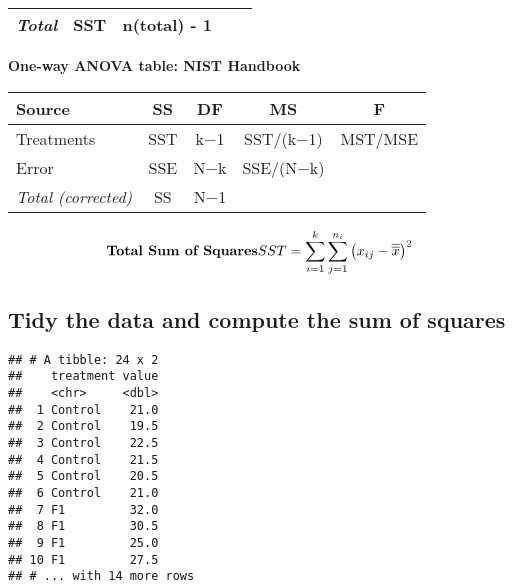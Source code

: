 \documentclass[]{book}
\newenvironment{Shaded}{\begin{snugshade}}{\end{snugshade}}
\newcommand{\DataTypeTok}[1]{\textcolor[rgb]{0.13,0.29,0.53}{#1}}
\newcommand{\KeywordTok}[1]{\textcolor[rgb]{0.13,0.29,0.53}{\textbf{#1}}}
\newcommand{\NormalTok}[1]{#1}
\newcommand{\OperatorTok}[1]{\textcolor[rgb]{0.81,0.36,0.00}{\textbf{#1}}}
\newcommand{\StringTok}[1]{\textcolor[rgb]{0.31,0.60,0.02}{#1}}
\theoremstyle{definition}
\theoremstyle{definition}
\theoremstyle{definition}
\theoremstyle{remark}
\begin{document}
\begin{longtable}[]{@{}lcccc@{}}
\begin{minipage}[t]{0.19\columnwidth}\raggedright
\emph{Total}\strut
\end{minipage} & \begin{minipage}[t]{0.19\columnwidth}\centering
SST\strut
\end{minipage} & \begin{minipage}[t]{0.22\columnwidth}\centering
n(total) - 1\strut
\end{minipage} & \begin{minipage}[t]{0.17\columnwidth}\centering
\strut
\end{minipage} & \begin{minipage}[t]{0.08\columnwidth}\centering
\strut
\end{minipage}\tabularnewline
\bottomrule
\end{longtable}

\textbf{One-way ANOVA table: NIST Handbook}

\begin{longtable}[]{@{}lcccc@{}}
\toprule
Source & SS & DF & MS & F\tabularnewline
\midrule
\endhead
Treatments & SST & k−1 & SST/(k−1) & MST/MSE\tabularnewline
Error & SSE & N−k & SSE/(N−k) &\tabularnewline
\emph{Total (corrected)} & SS & N−1 & &\tabularnewline
\bottomrule
\end{longtable}

\[
\textbf{Total Sum of Squares} \\ 
~ \\
SST = \sum_{i=1}^k \sum_{j=1}^{n_i} \left ( x_{ij} - \overline{\overline{x}} \right )^2
\]

\hypertarget{tidy-the-data-and-compute-the-sum-of-squares}{%
\subsection{Tidy the data and compute the sum of
squares}\label{tidy-the-data-and-compute-the-sum-of-squares}}

\begin{Shaded}
\end{Shaded}

\begin{verbatim}
## # A tibble: 24 x 2
##    treatment value
##    <chr>     <dbl>
##  1 Control    21.0
##  2 Control    19.5
##  3 Control    22.5
##  4 Control    21.5
##  5 Control    20.5
##  6 Control    21.0
##  7 F1         32.0
##  8 F1         30.5
##  9 F1         25.0
## 10 F1         27.5
## # ... with 14 more rows
\end{verbatim}
\end{document}
